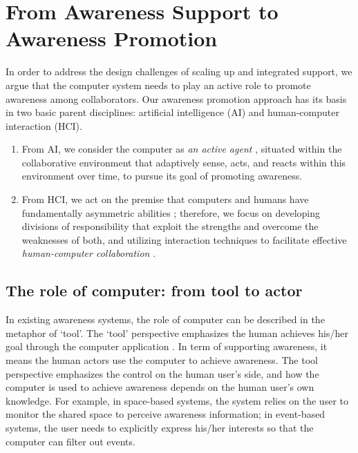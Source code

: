 \section{From Awareness Support to Awareness Promotion} %
\label{sec:from_support_to_promotion}
In order to address the design challenges of scaling up and integrated support, we argue that the computer system needs to play an active role to promote awareness among collaborators. Our awareness promotion approach has its basis in two basic parent disciplines:  artificial intelligence (AI) and human-computer interaction (HCI). 
\begin{enumerate}
   \item From AI, we consider the computer as \emph{an active agent} \cite{Brown99activeuser}, situated within the collaborative environment that adaptively sense, acts, and reacts within this environment over time, to pursue its goal of promoting awareness.
   \item From HCI, we act on the premise that computers and humans have fundamentally asymmetric abilities \cite{Dalal1994}; therefore, we focus on developing divisions of responsibility that exploit the strengths and overcome the weaknesses of both, and utilizing interaction techniques to facilitate effective \emph{human-computer collaboration} \cite{Terveen1995}.
\end{enumerate}

\subsection{The role of computer: from tool to actor} %
\label{sub:the_role_of_computer}
In existing awareness systems, the role of computer can be described in the metaphor of `tool'. The `tool' perspective emphasizes the human achieves his/her goal through the computer application \cite{Bodker1997}. In term of supporting awareness, it means the human actors use the computer to achieve awareness. The tool perspective emphasizes the control on the human user's side, and how the computer is used to achieve awareness depends on the human user's own knowledge. For example, in space-based systems, the system relies on the user to monitor the shared space to perceive awareness information; in event-based systems, the user needs to explicitly express his/her interests so that the computer can filter out events. 

